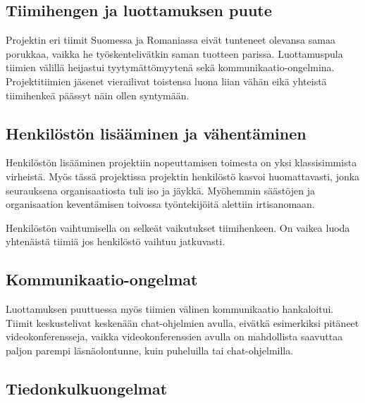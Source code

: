 \documentclass[a4paper]{article}
\begin{document}
\subsection{Tiimihengen ja luottamuksen puute}

Projektin eri tiimit Suomessa ja Romaniassa eivät tunteneet olevansa samaa porukkaa, vaikka he työskentelivätkin saman tuotteen parissa. Luottamuspula tiimien välillä heijastui tyytymättömyytenä sekä kommunikaatio-ongelmina. Projektitiimien jäsenet vierailivat toistensa luona liian vähän eikä yhteistä tiimihenkeä päässyt näin ollen syntymään. 

\subsection{Henkilöstön lisääminen ja vähentäminen}

Henkilöstön lisääminen projektiin nopeuttamisen toimesta on yksi klassisimmista virheistä. Myös tässä projektissa projektin henkilöstö kasvoi huomattavasti, jonka seurauksena organisaatiosta tuli iso ja jäykkä. Myöhemmin säästöjen ja organisaation keventämisen toivossa työntekijöitä alettiin irtisanomaan.

Henkilöstön vaihtumisella on selkeät vaikutukset tiimihenkeen. On vaikea luoda yhtenäistä tiimiä jos henkilöstö vaihtuu jatkuvasti. 

\subsection{Kommunikaatio-ongelmat}

Luottamuksen puuttuessa myös tiimien välinen kommunikaatio hankaloitui. Tiimit keskustelivat keskenään chat-ohjelmien avulla, eivätkä esimerkiksi pitäneet videokonferensseja, vaikka videokonferenssien avulla on mahdollista saavuttaa paljon parempi läsnäolontunne, kuin puheluilla tai chat-ohjelmilla.

\subsection{Tiedonkulkuongelmat}
\end{document}
